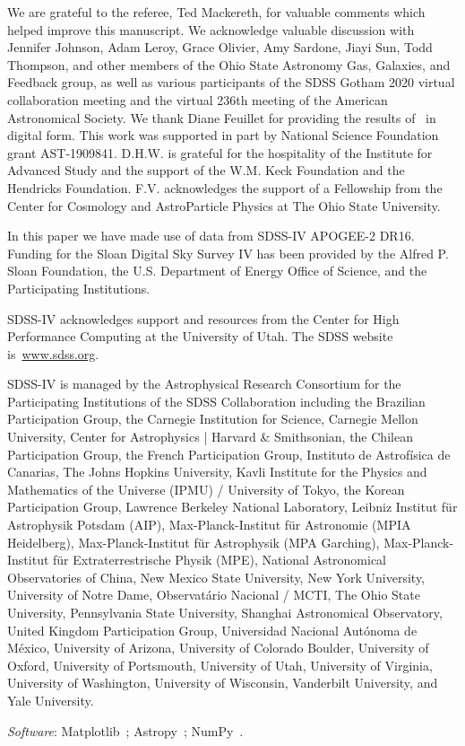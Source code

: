 \documentclass[draft2.tex]{subfiles}
\begin{document}
We are grateful to the referee, Ted Mackereth, for valuable comments which 
helped improve this manuscript. 
We acknowledge valuable discussion with Jennifer Johnson, Adam Leroy, Grace 
Olivier, Amy Sardone, Jiayi Sun, Todd Thompson, and other members of the Ohio 
State Astronomy Gas, Galaxies, and Feedback group, as well as various 
participants of the SDSS Gotham 2020 virtual collaboration meeting and the 
virtual 236th meeting of the American Astronomical Society. 
We thank Diane Feuillet for providing the results of~\citet{Feuillet2019} in 
digital form. 
This work was supported in part by National Science Foundation grant 
AST-1909841. 
D.H.W. is grateful for the hospitality of the Institute for Advanced Study and 
the support of the W.M. Keck Foundation and the Hendricks Foundation. 
F.V. acknowledges the support of a Fellowship from the Center for Cosmology and 
AstroParticle Physics at The Ohio State University. 
\par 
In this paper we have made use of data from SDSS-IV APOGEE-2 DR16. 
Funding for the Sloan Digital Sky 
Survey IV has been provided by the 
Alfred P. Sloan Foundation, the U.S. 
Department of Energy Office of 
Science, and the Participating 
Institutions. 
\par 
SDSS-IV acknowledges support and 
resources from the Center for High 
Performance Computing  at the 
University of Utah. The SDSS 
website is~\url{www.sdss.org}.
\par 
SDSS-IV is managed by the 
Astrophysical Research Consortium 
for the Participating Institutions 
of the SDSS Collaboration including 
the Brazilian Participation Group, 
the Carnegie Institution for Science, 
Carnegie Mellon University, Center for 
Astrophysics | Harvard \& 
Smithsonian, the Chilean Participation 
Group, the French Participation Group, 
Instituto de Astrof\'isica de 
Canarias, The Johns Hopkins 
University, Kavli Institute for the 
Physics and Mathematics of the 
Universe (IPMU) / University of 
Tokyo, the Korean Participation Group, 
Lawrence Berkeley National Laboratory, 
Leibniz Institut f\"ur Astrophysik 
Potsdam (AIP),  Max-Planck-Institut 
f\"ur Astronomie (MPIA Heidelberg), 
Max-Planck-Institut f\"ur 
Astrophysik (MPA Garching), 
Max-Planck-Institut f\"ur 
Extraterrestrische Physik (MPE), 
National Astronomical Observatories of 
China, New Mexico State University, 
New York University, University of 
Notre Dame, Observat\'ario 
Nacional / MCTI, The Ohio State 
University, Pennsylvania State 
University, Shanghai 
Astronomical Observatory, United 
Kingdom Participation Group, 
Universidad Nacional Aut\'onoma 
de M\'exico, University of Arizona, 
University of Colorado Boulder, 
University of Oxford, University of 
Portsmouth, University of Utah, 
University of Virginia, University 
of Washington, University of 
Wisconsin, Vanderbilt University, 
and Yale University.

\textit{Software}: Matplotlib~\citep{Matplotlib}; Astropy~\citep{Astropy2013, 
Astropy2018}; NumPy~\citep{NumPy}. 
\end{document}
